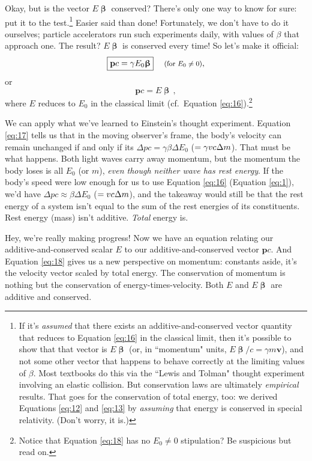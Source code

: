 \documentclass[12pt]{article}
\renewcommand{\vv}[1]{\mathbf{#1}}
\newcommand{\vvbeta}{\bm{\upbeta}}
\begin{document}
Okay, but is the vector $E \vvbeta$ conserved? There's only one way to know for sure: put it to the test.\footnote{If it's \emph{assumed} that there exists an additive-and-conserved vector quantity that reduces to Equation \ref{eq:16} in the classical limit, then it's possible to show that that vector is $E \vvbeta$ (or, in ``momentum" units, $E \vvbeta/c = \gamma m \vv v$), and not some other vector that happens to behave correctly at the limiting values of $\beta$. Most textbooks do this via the ``Lewis and Tolman" thought experiment involving an elastic collision. But conservation laws are ultimately \emph{empirical} results. That goes for the conservation of total energy, too: we derived Equations \ref{eq:12} and \ref{eq:13} by \emph{assuming} that energy is conserved in special relativity. (Don't worry, it is.)} Easier said than done! Fortunately, we don't have to do it ourselves; particle accelerators run such experiments daily, with values of $\beta$ that approach one. The result? $E \vvbeta$ is conserved every time! So let's make it official:
\begin{equation}\label{eq:17}
\boxed{\vv p c = \gamma E_0 \vvbeta}  \quad \textrm{\footnotesize{ (for $E_0 \neq 0$)}},
\end{equation}
or
\begin{equation}\label{eq:18}
\boxed{\vv p c = E \vvbeta} \, ,
\end{equation}
where $E$ reduces to $E_0$ in the classical limit (cf.\ Equation \ref{eq:16}).\footnote{Notice that Equation \ref{eq:18} has no $E_0 \neq 0$ stipulation? Be suspicious but read on.}

We can apply what we've learned to Einstein's thought experiment. Equation \ref{eq:17} tells us that in the moving observer's frame, the body's velocity can remain unchanged if and only if its $\Delta p c = \gamma \beta \Delta E_0$ ($= \gamma v c \mkern.5mu \Delta m$). That must be what happens. Both light waves carry away momentum, but the momentum the body loses is all $E_0$ (or $m$), \emph{even though neither wave has rest energy}. If the body's speed were low enough for us to use Equation \ref{eq:16} (Equation \ref{eq:1}), we'd have $\Delta p c \approx \beta \Delta E_0$ ($ = v c \mkern.5mu \Delta m$), and the takeaway would still be that the rest energy of a system isn't equal to the sum of the rest energies of its constituents. Rest energy (mass) isn't additive. \emph{Total} energy is.

Hey, we're really making progress! Now we have an equation relating our additive-and-conserved scalar $E$ to our additive-and-conserved vector $\vv p c$. And Equation \ref{eq:18} gives us a new perspective on momentum: constants aside, it's the velocity vector scaled by total energy. The conservation of momentum is nothing but the conservation of energy-times-velocity. Both $E$ and $E \vvbeta$ are additive and conserved.
\end{document}
